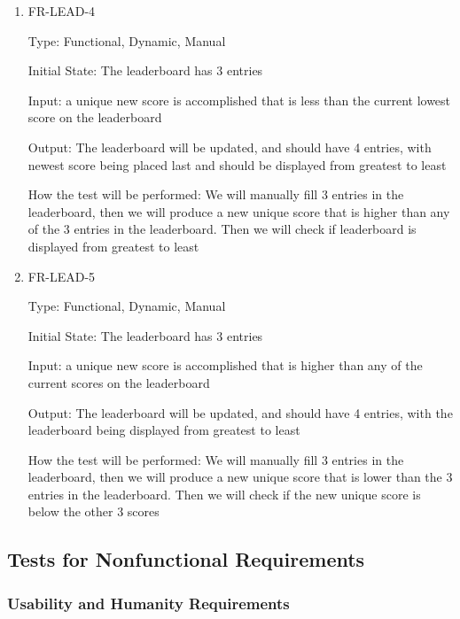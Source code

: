 \documentclass[12pt, titlepage]{article}
\begin{document}
\begin{enumerate}
	\item{FR-LEAD-4\\}
	
	Type: Functional, Dynamic, Manual
	
	Initial State: The leaderboard has 3 entries
	
	Input: a unique new score is accomplished that is less than the current lowest score on the leaderboard
	
	Output: The leaderboard will be updated, and should have 4 entries, with newest score being placed last and should be displayed from greatest to least
	
	How the test will be performed: We will manually fill 3 entries in the leaderboard, then we will produce a new unique score that is higher than any of the 3 entries in the leaderboard. Then we will check if leaderboard is displayed from greatest to least
	
	\item{FR-LEAD-5\\}
	
	Type: Functional, Dynamic, Manual
	
	Initial State: The leaderboard has 3 entries
	
	Input: a unique new score is accomplished that is higher than any of the current scores on the leaderboard
	
	Output: The leaderboard will be updated, and should have 4 entries, with the leaderboard being displayed from greatest to least
	
	How the test will be performed: We will manually fill 3 entries in the leaderboard, then we will produce a new unique score that is lower than the 3 entries in the leaderboard. Then we will check if the new unique score is below the other 3 scores
\end{enumerate}

\subsection{Tests for Nonfunctional Requirements}

\subsubsection{Usability and Humanity Requirements}
		
\end{document}
